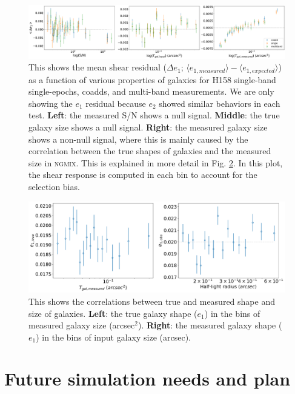 \documentclass[fleqn,usenatbib]{mnras}
\begin{document}
\begin{figure}
    \centering
	\includegraphics[width=\textwidth]{H158_meanshear_measured_properties_perbin_e1_v4.pdf}
    \caption{This shows the mean shear residual ($\Delta e_{1}$; $\langle e_{1,measured} \rangle - \langle e_{1,expected} \rangle$) as a function of various properties of galaxies for H158 single-band single-epochs, coadds, and multi-band measurements. We are only showing the $e_1$ residual because $e_{2}$ showed similar behaviors in each test. \textbf{Left}: the measured S/N shows a null signal. \textbf{Middle}: the true galaxy size shows a null signal. \textbf{Right}: the measured galaxy size shows a non-null signal, where this is mainly caused by the correlation between the true shapes of galaxies and the measured size in \textsc{ngmix}. This is explained in more detail in Fig. \ref{fig:sizecorrelation}. In this plot, the shear response is computed in each bin to account for the selection bias.}
    \label{fig:meanshear}
\end{figure}

\begin{figure}
    \centering
	\includegraphics[width=\columnwidth]{H158_true_obs_e1_size.pdf}
    \caption{This shows the correlations between true and measured shape and size of galaxies. \textbf{Left}: the true galaxy shape ($e_1$) in the bins of measured galaxy size (arcsec$^2$). \textbf{Right}: the measured galaxy shape ($e_1$) in the bins of input galaxy size (arcsec).}
    \label{fig:sizecorrelation}
\end{figure}


\section{Future simulation needs and plan}
\label{sec:discussion}
\end{document}
